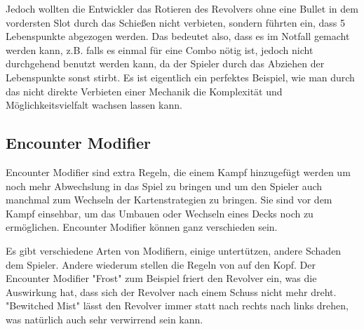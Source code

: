 Jedoch wollten die Entwickler das Rotieren des Revolvers ohne eine Bullet in dem vordersten Slot durch das Schießen nicht verbieten, sondern führten ein,
dass 5 Lebenspunkte abgezogen werden. Das bedeutet also, dass es im Notfall gemacht werden kann, z.B. falls es einmal für
eine Combo nötig ist, jedoch nicht durchgehend benutzt werden kann, da der Spieler durch das Abziehen der Lebenspunkte sonst stirbt.
Es ist eigentlich ein perfektes Beispiel, wie man durch das nicht direkte Verbieten einer Mechanik die Komplexität und
Möglichkeitsvielfalt wachsen lassen kann.


\subsection{Encounter Modifier}\label{encounter_modifier}


Encounter Modifier sind extra Regeln, die einem Kampf hinzugefügt werden um noch mehr Abwechslung in das Spiel zu bringen
und um den Spieler auch manchmal zum Wechseln der Kartenstrategien zu bringen.
Sie sind vor dem Kampf einsehbar, um das Umbauen oder Wechseln eines Decks noch zu ermöglichen.
Encounter Modifier können ganz verschieden sein.

Es gibt verschiedene Arten von Modifiern, einige untertützen, andere Schaden dem Spieler. Andere wiederum stellen die Regeln von \FF auf den Kopf.
Der Encounter Modifier "Frost" zum Beispiel friert den Revolver ein, was die Auswirkung hat, dass sich der Revolver  nach einem Schuss nicht mehr dreht.
"Bewitched Mist" lässt den Revolver immer statt nach rechts nach links drehen, was natürlich auch sehr verwirrend sein kann.

\renewcommand{\kapitelautor}{}
